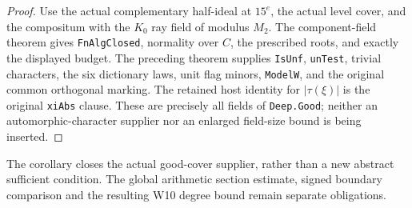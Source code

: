 \begin{proof}
Use the actual complementary half-ideal at $15^e$, the actual
level cover, and the compositum with the $K_0$ ray field of
modulus $M_2$.  The component-field theorem gives
\texttt{FnAlgClosed}, normality over $C$, the prescribed roots,
and exactly the displayed budget.  The preceding theorem
supplies \texttt{IsUnf}, \texttt{unTest}, trivial characters,
the six dictionary laws, unit flag minors, \texttt{ModelW},
and the original common orthogonal marking.  The retained
host identity for $|\tau(\xi)|$ is the original
\texttt{xiAbs} clause.  These are precisely all fields of
\texttt{Deep.Good}; neither an automorphic-character supplier
nor an enlarged field-size bound is being inserted.
\end{proof}

The corollary closes the actual good-cover supplier, rather than a
new abstract sufficient condition.  The global arithmetic section
estimate, signed boundary comparison and the resulting W10 degree
bound remain separate obligations.
